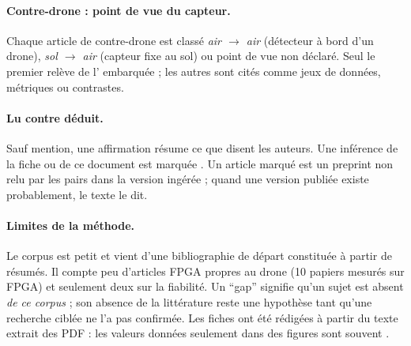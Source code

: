 \paragraph{Contre-drone : point de vue du capteur.} Chaque article de contre-drone est
classé \emph{air $\rightarrow$ air} (détecteur à bord d'un drone), \emph{sol
$\rightarrow$ air} (capteur fixe au sol) ou point de vue non déclaré. Seul le premier
relève de l' embarquée ; les autres sont cités comme jeux de données, métriques ou
contrastes.

\paragraph{Lu contre déduit.} Sauf mention, une affirmation résume ce que disent les
auteurs. Une inférence de la fiche ou de ce document est marquée \deduit. Un article
marqué \pp{} est un preprint non relu par les pairs dans la version ingérée ; quand une
version publiée existe probablement, le texte le dit.

\paragraph{Limites de la méthode.} Le corpus est petit et vient d'une bibliographie de
départ constituée à partir de résumés. Il compte peu d'articles FPGA propres au drone
(10 papiers mesurés sur FPGA) et seulement deux sur la fiabilité. Un \enquote{gap}
signifie qu'un sujet est absent \emph{de ce corpus} ; son absence de la littérature reste
une hypothèse tant qu'une recherche ciblée ne l'a pas confirmée. Les fiches ont été
rédigées à partir du texte extrait des PDF : les valeurs données seulement dans des
figures sont souvent \nr.
